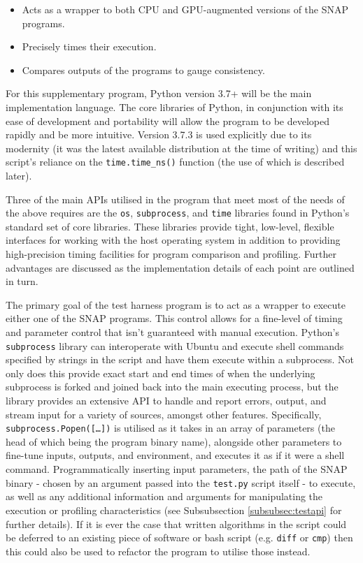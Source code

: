 \documentclass[conference]{IEEEtran}
\begin{document}
\begin{itemize}
    \item Acts as a wrapper to both CPU and GPU-augmented versions of the SNAP programs.
    \item Precisely times their execution.
    \item Compares outputs of the programs to gauge consistency.
\end{itemize}

For this supplementary program, Python version 3.7+ will be the main implementation language. The core libraries of Python, in conjunction with its ease of development and portability will allow the program to be developed rapidly and be more intuitive. Version 3.7.3 is used explicitly due to its modernity (it was the latest available distribution at the time of writing) and this script's reliance on the \texttt{time.time\_ns()} function (the use of which is described later).

Three of the main APIs utilised in the program that meet most of the needs of the above requires are the \texttt{os}, \texttt{subprocess}, and \texttt{time} libraries found in Python's standard set of core libraries. These libraries provide tight, low-level, flexible interfaces for working with the host operating system in addition to providing high-precision timing facilities for program comparison and profiling. Further advantages are discussed as the implementation details of each point are outlined in turn.

The primary goal of the test harness program is to act as a wrapper to execute either one of the SNAP programs. This control allows for a fine-level of timing and parameter control that isn't guaranteed with manual execution. Python's \texttt{subprocess} library can interoperate with Ubuntu and execute shell commands specified by strings in the script and have them execute within a subprocess. Not only does this provide exact start and end times of when the underlying subprocess is forked and joined back into the main executing process, but the library provides an extensive API to handle and report errors, output, and stream input for a variety of sources, amongst other features. Specifically, \texttt{subprocess.Popen([\dots])} is utilised as it takes in an array of parameters (the head of which being the program binary name), alongside other parameters to fine-tune inputs, outputs, and environment, and executes it as if it were a shell command. Programmatically inserting input parameters, the path of the SNAP binary - chosen by an argument passed into the \texttt{test.py} script itself - to execute, as well as any additional information and arguments for manipulating the execution or profiling characteristics (see Subsubsection \ref{subsubsec:testapi} for further details). If it is ever the case that written algorithms in the script could be deferred to an existing piece of software or bash script (e.g. \texttt{diff} or \texttt{cmp}) then this could also be used to refactor the program to utilise those instead.
\end{document}
